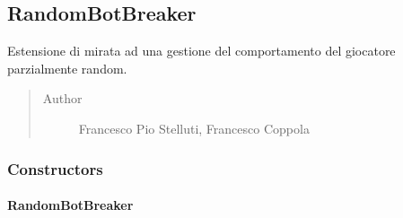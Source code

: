 \documentclass[letterpaper,10pt,italian,openany,oneside]{sphinxmanual}
\begin{document}
\subsection{RandomBotBreaker}
\label{\detokenize{source/it/unicam/cs/pa/mastermind/players/RandomBotBreaker:randombotbreaker}}\label{\detokenize{source/it/unicam/cs/pa/mastermind/players/RandomBotBreaker::doc}}

\begin{fulllineitems}
\label{\detokenize{source/it/unicam/cs/pa/mastermind/players/RandomBotBreaker:it.unicam.cs.pa.mastermind.players.RandomBotBreaker}}
Estensione di  mirata ad una gestione del comportamento del giocatore parzialmente random.
\begin{quote}\begin{description}
\item[{Author}] \leavevmode
Francesco Pio Stelluti, Francesco Coppola

\end{description}\end{quote}

\end{fulllineitems}



\subsubsection{Constructors}
\label{\detokenize{source/it/unicam/cs/pa/mastermind/players/RandomBotBreaker:constructors}}

\paragraph{RandomBotBreaker}
\label{\detokenize{source/it/unicam/cs/pa/mastermind/players/RandomBotBreaker:id1}}

\begin{fulllineitems}
\label{\detokenize{source/it/unicam/cs/pa/mastermind/players/RandomBotBreaker:it.unicam.cs.pa.mastermind.players.RandomBotBreaker.RandomBotBreaker()}}
\end{fulllineitems}
\end{document}
